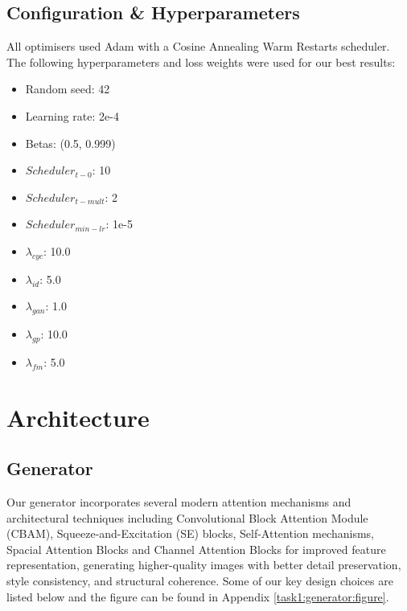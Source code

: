 \documentclass[twoside,english,notitlepage]{report}
\begin{document}
\subsection{Configuration \& Hyperparameters}
All optimisers used Adam with a Cosine Annealing Warm Restarts scheduler. The following hyperparameters and loss weights were used for our best results:

\begin{multicols}{3}
    \begin{itemize}
        \item Random seed: 42
        \item Learning rate: 2e-4
        \item Betas: (0.5, 0.999)
        \item $Scheduler_{t-0}$: 10
        \item $Scheduler_{t-mult}$: 2
        \item $Scheduler_{min-lr}$: 1e-5
        \item $\lambda_{cyc}$: 10.0
        \item $\lambda_{id}$: 5.0
        \item $\lambda_{gan}$: 1.0
        \item $\lambda_{gp}$: 10.0
        \item $\lambda_{fm}$: 5.0
    \end{itemize}
\end{multicols}

\section{Architecture}

\subsection{Generator}\label{task1:generator}
Our generator incorporates several modern attention mechanisms and architectural techniques including Convolutional Block Attention Module (CBAM), Squeeze-and-Excitation (SE) blocks, Self-Attention mechanisms, Spacial Attention Blocks and Channel Attention Blocks for improved feature representation, generating higher-quality images with better detail preservation, style consistency, and structural coherence. Some of our key design choices are listed below and the figure can be found in Appendix \ref{task1:generator:figure}.
\end{document}
